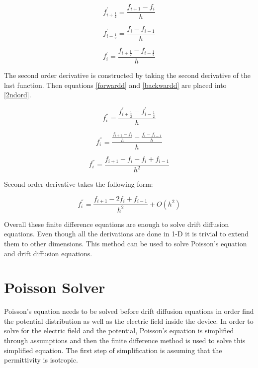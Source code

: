 \begin{doublespace}
\begin{equation}
f_{i+\frac{1}{2}}^{'}=\frac{f_{i+1}-f_{i}}{h}
\label{forwardd}
\end{equation}

\begin{equation}
f_{i-\frac{1}{2}}^{'}=\frac{f_{i}-f_{i-1}}{h}
\label{backwardd}
\end{equation}

\begin{equation}
f^{'}_{i}=\frac{f_{i+\frac{1}{2}}-f_{i-\frac{1}{2}}}{h}
\label{2ndord}
\end{equation}

The second order derivative is constructed by taking the second derivative of the last function. Then equations \ref{forwardd} and \ref{backwardd} are placed into \ref{2ndord}.

\begin{equation}\nonumber
f^{''}_{i}=\frac{f_{i+\frac{1}{2}}^{'}-f_{i-\frac{1}{2}}^{'}}{h}
\end{equation}

\begin{equation}\nonumber
f^{''}_{i}=\frac{\frac{f_{i+1}-f_{i}}{h}-\frac{f_{i}-f_{i-1}}{h}}{h}
\end{equation}

\begin{equation}\nonumber
f^{''}_{i}=\frac{f_{i+1}-f_{i}-f_{i}+f_{i-1}}{h^2}
\end{equation}

Second order derivative takes the following form:

\begin{equation}
f^{''}_{i}=\frac{f_{i+1}-2f_{i}+f_{i-1}}{h^2}+O(h^2)
\label{fdc2}
\end{equation}

Overall these finite difference equations are enough to solve drift diffusion equations. Even though all the derivations are done in 1-D it is trivial to extend them to other dimensions. This method can be used to solve Poisson's equation and drift diffusion equations.

\clearpage

\section{Poisson Solver}

Poisson's equation needs to be solved before drift diffusion equations in order find the potential distribution as well as the electric field inside the device. In order to solve for the electric field and the potential, Poisson's equation is simplified through assumptions and then the finite difference method is used to solve this simplified equation\cite{smith1985numerical}. The first step of simplification is assuming that the permittivity is isotropic.
 

\end{doublespace}
